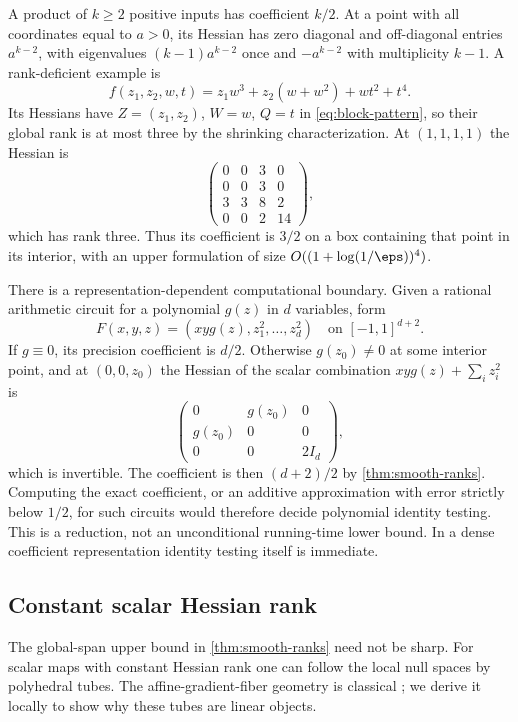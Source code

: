 A product of $k\ge2$ positive inputs has coefficient $k/2$. At a point
with all coordinates equal to $a>0$, its Hessian has zero diagonal and
off-diagonal entries $a^{k-2}$, with eigenvalues
$(k-1)a^{k-2}$ once and $-a^{k-2}$ with multiplicity $k-1$.
A rank-deficient example is
\[
 f(z_1,z_2,w,t)=z_1w^3+z_2(w+w^2)+wt^2+t^4.
\]
Its Hessians have $Z=(z_1,z_2)$, $W=w$, $Q=t$ in
\eqref{eq:block-pattern}, so their global rank is at most three by the
shrinking characterization. At $(1,1,1,1)$ the Hessian is
\[
 \begin{pmatrix}0&0&3&0\\0&0&3&0\\3&3&8&2\\0&0&2&14\end{pmatrix},
\]
which has rank three. Thus its coefficient is $3/2$ on a box containing
that point in its interior, with an upper formulation of size
$O((1+\log(1/\eps))^4)$.

There is a representation-dependent computational boundary. Given a
rational arithmetic circuit for a polynomial $g(z)$ in $d$ variables,
form
\[
 F(x,y,z)=(xyg(z),z_1^2,\ldots,z_d^2)
 \quad\text{on }[-1,1]^{d+2}.
\]
If $g\equiv0$, its precision coefficient is $d/2$. Otherwise
$g(z_0)\ne0$ at some interior point, and at $(0,0,z_0)$ the Hessian of
the scalar combination $xyg(z)+\sum_i z_i^2$ is
\[
 \begin{pmatrix}0&g(z_0)&0\\g(z_0)&0&0\\0&0&2I_d\end{pmatrix},
\]
which is invertible. The coefficient is then $(d+2)/2$ by
\cref{thm:smooth-ranks}. Computing the exact coefficient, or an additive
approximation with error strictly below $1/2$, for such circuits would
therefore decide polynomial identity testing. This is a reduction, not
an unconditional running-time lower bound. In a dense coefficient
representation identity testing itself is immediate.

\subsection{Constant scalar Hessian rank}

The global-span upper bound in \cref{thm:smooth-ranks} need not be sharp.
For scalar maps with constant Hessian rank one can follow the local
null spaces by polyhedral tubes. The affine-gradient-fiber geometry is
classical \citep[Definition 1.1 and the following paragraph]{nicola2008};
we derive it locally to show why these tubes are linear objects.

